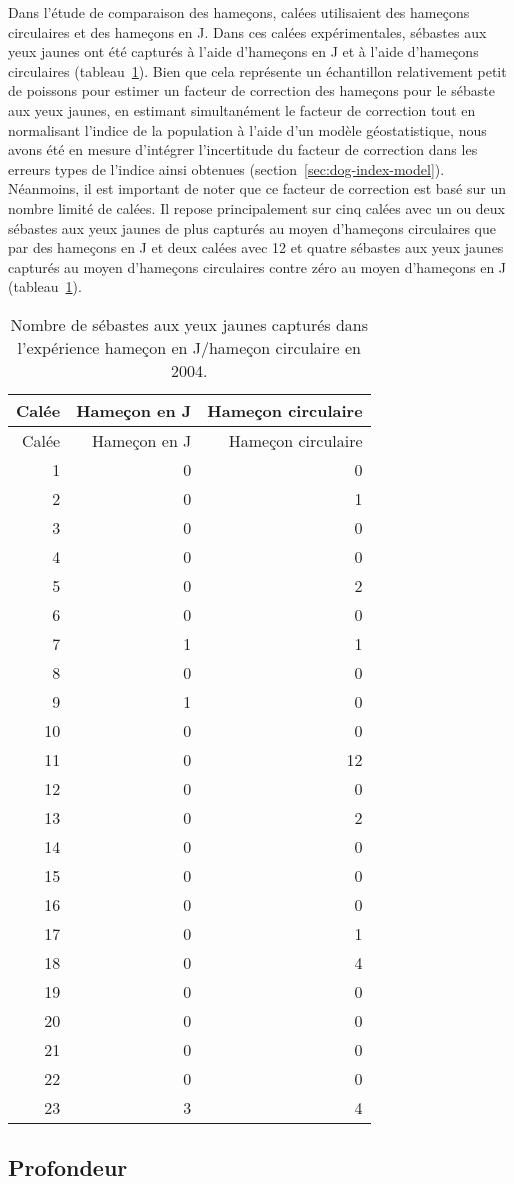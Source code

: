 \documentclass[french,11pt]{book}
\begin{document}
Dans l'étude de comparaison des hameçons,  calées utilisaient des hameçons circulaires et  des hameçons en J. Dans ces calées expérimentales,  sébastes aux yeux jaunes ont été capturés à l'aide d'hameçons en J et  à l'aide d'hameçons circulaires (tableau~\ref{tab:dogfish-hook-comparison}). Bien que cela représente un échantillon relativement petit de poissons pour estimer un facteur de correction des hameçons pour le sébaste aux yeux jaunes, en estimant simultanément le facteur de correction tout en normalisant l'indice de la population à l'aide d'un modèle géostatistique, nous avons été en mesure d'intégrer l'incertitude du facteur de correction dans les erreurs types de l'indice ainsi obtenues (section~\ref{sec:dog-index-model}). Néanmoins, il est important de noter que ce facteur de correction est basé sur un nombre limité de calées. Il repose principalement sur cinq calées avec un ou deux sébastes aux yeux jaunes de plus capturés au moyen d'hameçons circulaires que par des hameçons en J et deux calées avec 12 et quatre sébastes aux yeux jaunes capturés au moyen d'hameçons circulaires contre zéro au moyen d'hameçons en J (tableau~\ref{tab:dogfish-hook-comparison}).
\begin{longtable}[]{@{}rrr@{}}
\caption{\label{tab:dogfish-hook-comparison}Nombre de sébastes aux yeux jaunes capturés dans l'expérience hameçon en J/hameçon circulaire en 2004.}\tabularnewline
\toprule
Calée & Hameçon en J & Hameçon circulaire \\
\midrule
\endfirsthead
\toprule
Calée & Hameçon en J & Hameçon circulaire \\
\midrule
\endhead
1 & 0 & 0 \\
2 & 0 & 1 \\
3 & 0 & 0 \\
4 & 0 & 0 \\
5 & 0 & 2 \\
6 & 0 & 0 \\
7 & 1 & 1 \\
8 & 0 & 0 \\
9 & 1 & 0 \\
10 & 0 & 0 \\
11 & 0 & 12 \\
12 & 0 & 0 \\
13 & 0 & 2 \\
14 & 0 & 0 \\
15 & 0 & 0 \\
16 & 0 & 0 \\
17 & 0 & 1 \\
18 & 0 & 4 \\
19 & 0 & 0 \\
20 & 0 & 0 \\
21 & 0 & 0 \\
22 & 0 & 0 \\
23 & 3 & 4 \\
\bottomrule
\end{longtable}
\hypertarget{sec:dog-depth}{%
\subsection{Profondeur}\label{sec:dog-depth}}
\end{document}
